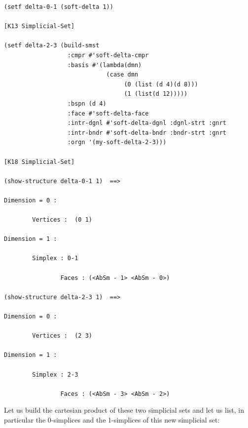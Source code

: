 {\footnotesize\begin{verbatim}
(setf delta-0-1 (soft-delta 1))

[K13 Simplicial-Set]

(setf delta-2-3 (build-smst 
                  :cmpr #'soft-delta-cmpr
                  :basis #'(lambda(dmn) 
                             (case dmn
                                  (0 (list (d 4)(d 8)))
                                  (1 (list(d 12)))))   
                  :bspn (d 4)
                  :face #'soft-delta-face
                  :intr-dgnl #'soft-delta-dgnl :dgnl-strt :gnrt
                  :intr-bndr #'soft-delta-bndr :bndr-strt :gnrt
                  :orgn '(my-soft-delta-2-3)))

[K18 Simplicial-Set]

(show-structure delta-0-1 1)  ==>

Dimension = 0 :

        Vertices :  (0 1)

Dimension = 1 :

        Simplex : 0-1

                Faces : (<AbSm - 1> <AbSm - 0>)

(show-structure delta-2-3 1)  ==>

Dimension = 0 :

        Vertices :  (2 3)

Dimension = 1 :

        Simplex : 2-3

                Faces : (<AbSm - 3> <AbSm - 2>)
\end{verbatim}}
Let us build the cartesian product of these two simplicial sets and let us list,
in particular the 
0-simplices and the 1-simplices of this new simplicial set:
